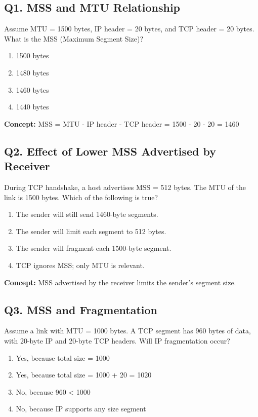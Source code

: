 \subsection*{Q1. MSS and MTU Relationship}
Assume MTU = 1500 bytes, IP header = 20 bytes, and TCP header = 20 bytes. What is the MSS (Maximum Segment Size)?

\begin{enumerate}[label=(\alph*)]
    \item 1500 bytes 
    \item 1480 bytes 
    \item 1460 bytes 
    \item 1440 bytes
\end{enumerate}

\textbf{Concept:} MSS = MTU - IP header - TCP header = 1500 - 20 - 20 = 1460


\subsection*{Q2. Effect of Lower MSS Advertised by Receiver}
During TCP handshake, a host advertises MSS = 512 bytes. The MTU of the link is 1500 bytes. Which of the following is true?

\begin{enumerate}[label=(\alph*)]
    \item The sender will still send 1460-byte segments. 
    \item The sender will limit each segment to 512 bytes. 
    \item The sender will fragment each 1500-byte segment. 
    \item TCP ignores MSS; only MTU is relevant.
\end{enumerate}

\textbf{Concept:} MSS advertised by the receiver limits the sender's segment size.


\subsection*{Q3. MSS and Fragmentation}
Assume a link with MTU = 1000 bytes. A TCP segment has 960 bytes of data, with 20-byte IP and 20-byte TCP headers. Will IP fragmentation occur?

\begin{enumerate}[label=(\alph*)]
    \item Yes, because total size = 1000 
    \item Yes, because total size = 1000 + 20 = 1020 
    \item No, because 960 < 1000 
    \item No, because IP supports any size segment
\end{enumerate}

